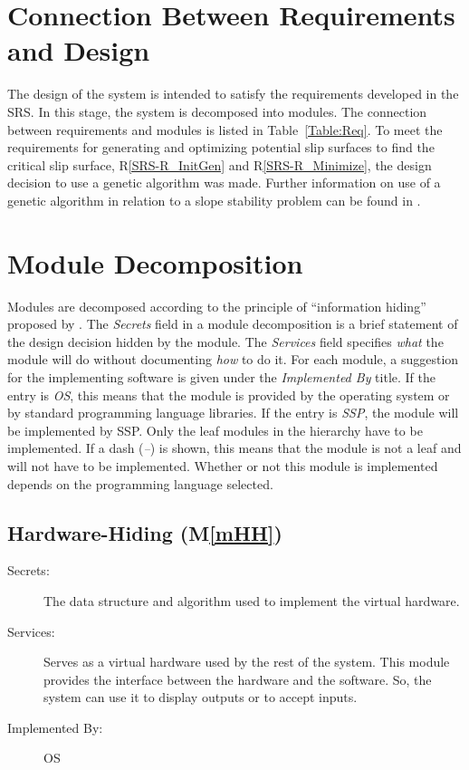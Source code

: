 \documentclass[12pt, titlepage]{article}
\newcommand{\progname}{SSP}
\newcommand{\rref}[1]{R\ref{#1}}
\newcommand{\mref}[1]{M\ref{#1}}
\begin{document}
\section{Connection Between Requirements and Design} \label{SecConnection}

The design of the system is intended to satisfy the
requirements developed in the SRS. In this stage, the system is
decomposed into modules. The connection between requirements and
modules is listed in Table~\ref{Table:Req}. To meet the requirements for 
generating and optimizing potential slip surfaces to find the critical slip 
surface, \rref{SRS-R_InitGen} and \rref{SRS-R_Minimize}, the design decision to 
use a genetic algorithm was made. Further information on use of a genetic 
algorithm in relation to a slope stability problem can be found in 
\cite{LiEtAl}.

\section{Module Decomposition} \label{SecMD}

\hspace{3ex}Modules are decomposed according to the principle of
``information hiding'' proposed by \citet{ParnasEtAl1984}. The
\emph{Secrets} field in a module decomposition is a brief statement of
the design decision hidden by the module. The \emph{Services} field
specifies \emph{what} the module will do without documenting
\emph{how} to do it. For each module, a suggestion for the
implementing software is given under the \emph{Implemented By}
title. If the entry is \emph{OS}, this means that the module is
provided by the operating system or by standard programming language
libraries. If the entry is \emph{\progname}, the module will be implemented by 
\progname. Only the leaf modules in the hierarchy have to be implemented. If a 
dash (\emph{--}) is shown, this means that the module is not a leaf and will 
not have to be implemented. Whether or not this module is implemented depends 
on the programming language selected.

\subsection{Hardware-Hiding (\mref{mHH})}

\begin{description}
\item[Secrets:]The data structure and algorithm used to implement the
  virtual hardware.
\item[Services:]Serves as a virtual hardware used by the rest of the
  system. This module provides the interface between the hardware and
  the software. So, the system can use it to display outputs or to
  accept inputs.
\item[Implemented By:] OS
\end{description}
\end{document}
